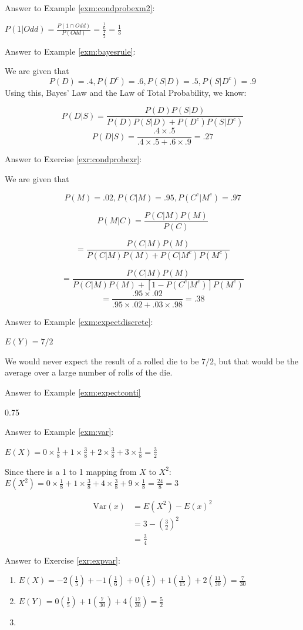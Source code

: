 \documentclass[]{book}
\theoremstyle{definition}
\theoremstyle{definition}
\theoremstyle{definition}
\theoremstyle{remark}
\begin{document}
Answer to Example \ref{exm:condprobexm2}:

\(P(1|Odd) = \frac{P(1 \cap Odd)}{P(Odd)} = \frac{\frac{1}{6}}{\frac{1}{2}} = \frac{1}{3}\)

Answer to Example \ref{exm:bayesrule}:

We are given that
\[P(D) = .4, P(D^c) = .6, P(S|D) = .5, P(S|D^c) = .9\]
Using this, Bayes' Law and the Law of Total Probability, we know:

\[P(D|S) = \frac{P(D)P(S|D)}{P(D)P(S|D) + P(D^c)P(S|D^c)}\]
\[P(D|S) = \frac{.4 \times .5}{.4 \times .5 + .6 \times .9 } = .27\]

Answer to Exercise \ref{exr:condprobexr}:

We are given that

\[P(M) = .02, P(C|M) = .95, P(C^c|M^c) = .97\]

\[P(M|C) = \frac{P(C|M)P(M)}{P(C)}\]

\[= \frac{P(C|M)P(M)}{P(C|M)P(M) + P(C|M^c)P(M^c)}\]

\[= \frac{P(C|M)P(M)}{P(C|M)P(M) + [1-P(C^c|M^c)]P(M^c)}\]
\[ = \frac{.95 \times .02}{.95 \times .02 + .03 \times .98} = .38\]

Answer to Example \ref{exm:expectdiscrete}:

\(E(Y)=7/2\)

We would never expect the result of a rolled die to be \(7/2\), but that would be the average over a large number of rolls of the die.

Answer to Example \ref{exm:expectconti}

0.75

Answer to Example \ref{exm:var}:

\(E(X) = 0 \times \frac{1}{8} + 1 \times \frac{3}{8} + 2 \times \frac{3}{8} + 3 \times \frac{1}{8} = \frac{3}{2}\)

Since there is a 1 to 1 mapping from \(X\) to \(X^2:\) \(E(X^2) = 0 \times \frac{1}{8} + 1 \times \frac{3}{8} + 4 \times \frac{3}{8} + 9 \times \frac{1}{8} = \frac{24}{8} = 3\)

\begin{align*}
\text{Var}(x) &= E(X^2) - E(x)^2\\
&= 3 - (\frac{3}{2})^2\\
&= \frac{3}{4}
\end{align*}

Answer to Exercise \ref{exr:expvar}:

\begin{enumerate}
\def\labelenumi{\arabic{enumi}.}
\item
  \(E(X) = -2(\frac{1}{5}) + -1(\frac{1}{6}) + 0(\frac{1}{5}) + 1(\frac{1}{15}) + 2(\frac{11}{30}) = \frac{7}{30}\)
\item
  \(E(Y) = 0(\frac{1}{5}) + 1(\frac{7}{30}) + 4(\frac{17}{30}) = \frac{5}{2}\)
\item
\end{enumerate}
\end{document}
